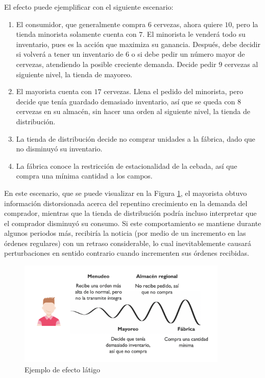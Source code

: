 El efecto puede ejemplificar con el siguiente escenario:

\begin{enumerate}
    \item El consumidor, que generalmente compra $6$ cervezas, ahora quiere $10$, pero la tienda minorista solamente cuenta con $7$. El minorista le venderá todo su inventario, pues es la acci\'on que maximiza su ganancia. Despu\'es, debe decidir si volverá a tener un inventario de $6$ o si debe pedir un número mayor de cervezas, atendiendo la posible creciente demanda. Decide pedir $9$ cervezas al siguiente nivel, la tienda de mayoreo.
    \item El mayorista cuenta con $17$ cervezas. Llena el pedido del minorista, pero decide que ten\'ia guardado demasiado inventario, as\'i que se queda con $8$ cervezas en su almac\'en, sin hacer una orden al siguiente nivel, la tienda de distribución.
    \item La tienda de distribuci\'on decide no comprar unidades a la f\'abrica, dado que no disminuy\'o su inventario.
    \item La f\'abrica conoce la restricci\'on de estacionalidad de la cebada, as\'i que compra una m\'inima cantidad a los campos.
\end{enumerate}

En este escenario, que se puede visualizar en la Figura \ref{bullwhip_effect}, el mayorista obtuvo informaci\'on distorsionada acerca del repentino crecimiento en la demanda del comprador, mientras que la tienda de distribución podr\'ia incluso interpretar que el comprador disminuy\'o su consumo. Si este comportamiento se mantiene durante algunos periodos m\'as, recibir\'ia la noticia (por medio de un incremento en las \'ordenes regulares) con un retraso considerable, lo cual inevitablemente causar\'a perturbaciones en sentido contrario cuando incrementen sus \'ordenes recibidas.\\

\begin{figure}[ht]
\caption{Ejemplo de efecto l\'atigo}
\label{bullwhip_effect}
\includegraphics[width=10cm]{tesis_tex/figs/bullwhip_effect.PNG}
\centering
\end{figure}

